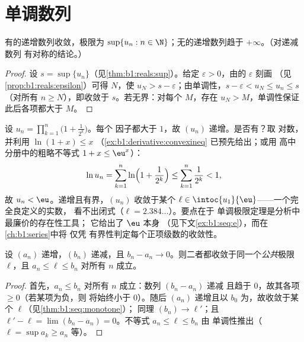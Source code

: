 \section{单调数列}

\begin{theorem}[单调极限定理]\label{thm:b1:seq:monotone}
有的递增数列收敛，极限为 $\sup\{u_n : n \in
\N\}$；无的递增数列趋于
$+\infty$。（对递减数列
有对称的结论。）
\end{theorem}

\begin{proof}
设 $s = \sup\{u_n\}$（见\cref{thm:b1:reals:sup}）。给定 $\varepsilon >
0$，由的 $\varepsilon$ 刻画
（见\cref{prop:b1:reals:epsilon}）可得 $N$，使 $u_N > s -
\varepsilon$；由单调性，$s - \varepsilon < u_N \leq u_n \leq
s$（对所有 $n \geq N$），即收敛于 $s$。若无界：对每个
$M$，存在 $u_N > M$，单调性保证此后各项都大于 $M$。
\end{proof}

\begin{example}[作为存在性工具的单调定理]\label{ex:b1:seq:existencemachine}
设 $u_n = \prod_{k=1}^{n} \bigl(1 + \frac{1}{2^k}\bigr)$。每个
因子都大于 $1$，故 $(u_n)$ 递增。是否有？取
对数，并利用 $\ln(1 + x) \leq x$
（\cref{ex:b1:derivative:convexineq} 已预先给出；或用
高中分册中的粗略不等式 $1 + x \leq \eu^x$）：
\[
\ln u_n = \sum_{k=1}^{n} \ln\Bigl(1 + \frac{1}{2^k}\Bigr)
\leq \sum_{k=1}^{n} \frac{1}{2^k} < 1 ,
\]
故 $u_n < \eu$。递增且有界，$(u_n)$ 收敛于某个
$\ell \in \intoc{u_1}{\eu}$——一个完全良定义的实数，
看不出闭式（$\ell = 2.384\dots$）。要点在于
单调极限定理是分析中最廉价的存在性工具；
它给出了 $\eu$ 本身
（见下文\cref{ex:b1:seq:e}），而在\cref{ch:b1:series}中将
仅凭
有界性判定每个正项级数的收敛性。
\end{example}

\begin{theorem}[相邻数列]\label{thm:b1:seq:adjacent}
设 $(a_n)$ 递增，$(b_n)$ 递减，且 $b_n - a_n \to
0$。则二者都收敛于同一个\emph{公共}极限 $\ell$，且 $a_n
\leq \ell \leq b_n$ 对所有 $n$ 成立。
\end{theorem}

\begin{proof}
首先，$a_n \leq b_n$ 对所有 $n$ 成立：数列 $(b_n - a_n)$ 递减
且趋于 $0$，故其各项 $\geq 0$（若某项为负，则
将始终小于 $0$）。随后 $(a_n)$ 递增且以
$b_0$ 为，故收敛于某个 $\ell$（见\cref{thm:b1:seq:monotone}）；
同理 $(b_n) \to \ell'$；且 $\ell' - \ell = \lim (b_n - a_n) =
0$。不等式 $a_n \leq \ell \leq b_n$ 由
单调性推出（$\ell = \sup a_k \geq a_n$ 等）。
\end{proof}

